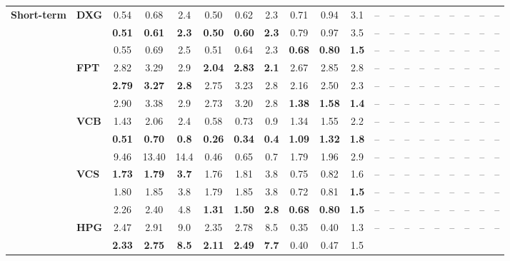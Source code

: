 \begin{table}[!t]
\begin{tabular*}{\textwidth}{@{\extracolsep{\fill}}llccc|ccc|ccc|ccc|ccc|ccc@{}}
\multirow{12}{*}{\textbf{Short-term}}
& \multirow{3}{*}{\textbf{DXG}} 
  & 0.54 & 0.68 & 2.4 & 0.50 & 0.62 & 2.3 & 0.71 & 0.94 & 3.1
  & -- & -- & -- & -- & -- & -- & -- & -- & -- \\
& 
  & \textbf{0.51} & \textbf{0.61} & \textbf{2.3} & \textbf{0.50} & \textbf{0.60} & \textbf{2.3} & 0.79 & 0.97 & 3.5
  & -- & -- & -- & -- & -- & -- & -- & -- & -- \\
& 
  & 0.55 & 0.69 & 2.5 & 0.51 & 0.64 & 2.3 & \textbf{0.68} & \textbf{0.80} & \textbf{1.5}
  & -- & -- & -- & -- & -- & -- & -- & -- & -- \\
& \multirow{3}{*}{\textbf{FPT}} 
  & 2.82 & 3.29 & 2.9 & \textbf{2.04} & \textbf{2.83} & \textbf{2.1} & 2.67 & 2.85 & 2.8
  & -- & -- & -- & -- & -- & -- & -- & -- & -- \\
& 
  & \textbf{2.79} & \textbf{3.27} & \textbf{2.8} & 2.75 & 3.23 & 2.8 & 2.16 & 2.50 & 2.3
  & -- & -- & -- & -- & -- & -- & -- & -- & -- \\
& 
  & 2.90 & 3.38 & 2.9 & 2.73 & 3.20 & 2.8 & \textbf{1.38} & \textbf{1.58} & \textbf{1.4}
  & -- & -- & -- & -- & -- & -- & -- & -- & -- \\
& \multirow{3}{*}{\textbf{VCB}} 
  & 1.43 & 2.06 & 2.4 & 0.58 & 0.73 & 0.9 & 1.34 & 1.55 & 2.2
  & -- & -- & -- & -- & -- & -- & -- & -- & -- \\
& 
  & \textbf{0.51} & \textbf{0.70} & \textbf{0.8} & \textbf{0.26} & \textbf{0.34} & \textbf{0.4} & \textbf{1.09} & \textbf{1.32} & \textbf{1.8}
  & -- & -- & -- & -- & -- & -- & -- & -- & -- \\
& 
  & 9.46 & 13.40 & 14.4 & 0.46 & 0.65 & 0.7 & 1.79 & 1.96 & 2.9
  & -- & -- & -- & -- & -- & -- & -- & -- & -- \\
& \multirow{3}{*}{\textbf{VCS}} 
  & \textbf{1.73} & \textbf{1.79} & \textbf{3.7} & 1.76 & 1.81 & 3.8 & 0.75 & 0.82 & 1.6
  & -- & -- & -- & -- & -- & -- & -- & -- & -- \\
& 
  & 1.80 & 1.85 & 3.8 & 1.79 & 1.85 & 3.8 & 0.72 & 0.81 & \textbf{1.5}
  & -- & -- & -- & -- & -- & -- & -- & -- & -- \\
& 
  & 2.26 & 2.40 & 4.8 & \textbf{1.31} & \textbf{1.50} & \textbf{2.8} & \textbf{0.68} & \textbf{0.80} & \textbf{1.5}
  & -- & -- & -- & -- & -- & -- & -- & -- & -- \\
& \multirow{3}{*}{\textbf{HPG}} 
  & 2.47 & 2.91 & 9.0 & 2.35 & 2.78 & 8.5 & 0.35 & 0.40 & 1.3
  & -- & -- & -- & -- & -- & -- & -- & -- & -- \\
& 
  & \textbf{2.33} & \textbf{2.75} & \textbf{8.5} & \textbf{2.11} & \textbf{2.49} & \textbf{7.7} & 0.40 & 0.47 & 1.5

\end{tabular*}
\end{table}
